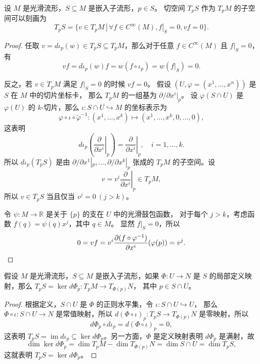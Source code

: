 \documentclass[fontset=none]{Notes}
\DeclareMathOperator\im{im}
\begin{document}
\begin{proposition}
  设 $M$ 是光滑流形，$S\subseteq M$ 是嵌入子流形，$p\in S$。
  切空间 $T_pS$ 作为 $T_pM$ 的子空间可以刻画为
  \[
    T_pS=\bigl\{v\in T_pM\,|\, \forall f\in C^\infty(M), f|_S=0,vf=0\bigr\}  .
  \]
\end{proposition}
\begin{proof}
  任取 $v=d\iota_p(w)\in T_p S\subseteq T_pM$，那么对于任意 $f\in C^\infty(M)$ 且 $f|_S=0$，有
  \[
    vf=d\iota_p(w)f=w(f\circ\iota_p)=w(f|_S)=0.
  \]

  反之，若 $v\in T_pM$ 满足 $f|_S=0$ 的时候 $vf=0$。
  假设 $(U,\varphi=(x^1,\dots,x^n))$ 是 $S$ 在 $M$ 中的切片坐标卡，
  那么 $T_pM$ 的一组基为 $\partial/\partial x^i|_p$。
  设 $\varphi(S\cap U)$ 是 $\varphi(U)$ 的 $k$-切片，那么
  $\iota:S\cap U\hookrightarrow M$ 的坐标表示为
  \[
    \varphi\circ\iota\circ\tilde\varphi^{-1}:\left(x^1,\dots,x^k\right)\mapsto
    \left(x^1,\dots,x^k,0,\dots,0\right)  ,
  \]
  这表明
  \[
    d\iota_p\left(\left.\frac{\partial}{\partial x^i}\right|_p\right)
    =  \left.\frac{\partial}{\partial x^i}\right|_p,\quad i=1,\dots,k.
  \]
  所以 $d\iota_p(T_pS)$ 是由 $\partial/\partial x^1|_p,\dots,\partial/\partial x^k|_p$
  张成的 $T_pM$ 的子空间。设
  \[
    v=v^i \left.\frac{\partial}{\partial x^i}\right|_p\in T_pM,  
  \]
  所以 $v\in T_pS$ 当且仅当 $v^j=0\ (j>k)$。

  令 $\psi:M\to \mathbb{R}$ 是关于 $\{p\}$ 的支在 $U$ 中的光滑鼓包函数，
  对于每个 $j>k$，考虑函数 $f(q)=\psi(q)x^j$，其中 $q\in M$。
  显然 $f|_S=0$，所以
  \[
    0=vf= v^i\frac{\partial (f\circ\varphi^{-1})}{\partial x^i}(\varphi(p))
    =v^j.\qedhere  
  \]
\end{proof}

\begin{proposition}
  假设 $M$ 是光滑流形，$S\subseteq M$ 是嵌入子流形，如果 $\varPhi:U\to N$
  是 $S$ 的局部定义映射，那么 $T_pS=\ker d\varPhi_p:T_pM\to T_{\varPhi(p)}N$，
  其中 $p\in S\cap U$。
\end{proposition}
\begin{proof}
  根据定义，$S\cap U$ 是 $\varPhi$ 的正则水平集，令 $\iota:S\cap U\hookrightarrow U$，
  那么 $\varPhi\circ\iota:S\cap U\to N$ 是常值映射，所以
  $d(\varPhi\circ\iota)_p:T_pS\to T_{\varPhi(p)}N$ 是零映射，所以
  \[
    d\varPhi_p\circ d\iota_p=d(\varPhi\circ\iota)_p=0,
  \]
  这表明 $T_pS=\im d\iota_p\subseteq \ker d\varPhi_p$。另一方面，$\varPhi$ 是定义映射表明
  $d\varPhi_p$ 是满射，故
  \[
    \dim\ker d\varPhi_p=\dim T_pM-\dim T_{\varPhi(p)}N=\dim S\cap U=
    \dim T_pS,
  \]
  这就表明 $T_pS=\ker d\varPhi_p$。
\end{proof}
\end{document}

